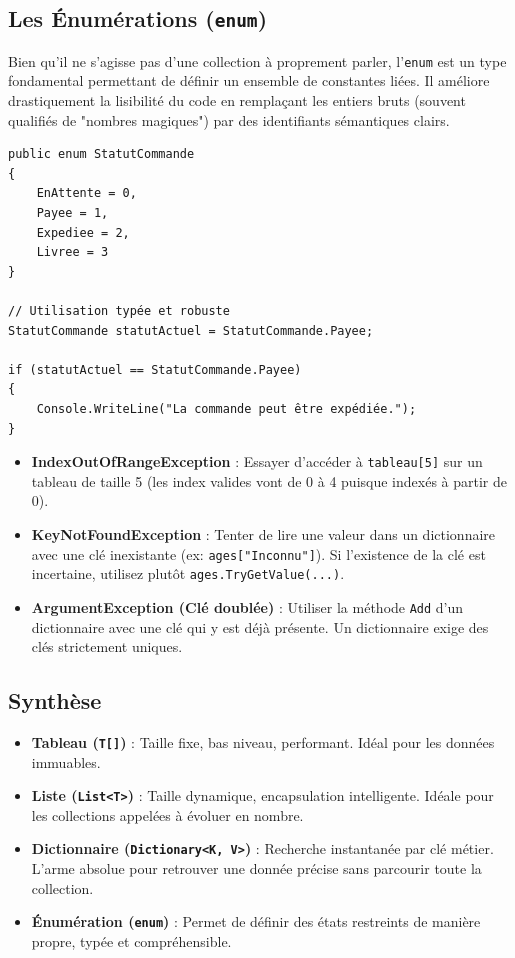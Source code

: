 \subsection{Les Énumérations (\texttt{enum})}
Bien qu'il ne s'agisse pas d'une collection à proprement parler, l'\texttt{enum} est un type fondamental permettant de définir un ensemble de constantes liées. Il améliore drastiquement la lisibilité du code en remplaçant les entiers bruts (souvent qualifiés de "nombres magiques") par des identifiants sémantiques clairs.

\begin{lstlisting}[style=csharpstyle]
public enum StatutCommande
{
    EnAttente = 0,
    Payee = 1,
    Expediee = 2,
    Livree = 3
}

// Utilisation typée et robuste
StatutCommande statutActuel = StatutCommande.Payee;

if (statutActuel == StatutCommande.Payee)
{
    Console.WriteLine("La commande peut être expédiée.");
}
\end{lstlisting}

\begin{tcolorbox}[colback=backcolour,colframe=keywordcolor,title=\textbf{Pièges Courants \& Erreurs}]
\begin{itemize}
    \item \textbf{IndexOutOfRangeException} : Essayer d'accéder à \texttt{tableau[5]} sur un tableau de taille 5 (les index valides vont de 0 à 4 puisque indexés à partir de 0).
    \item \textbf{KeyNotFoundException} : Tenter de lire une valeur dans un dictionnaire avec une clé inexistante (ex: \texttt{ages["Inconnu"]}). Si l'existence de la clé est incertaine, utilisez plutôt \texttt{ages.TryGetValue(...)}.
    \item \textbf{ArgumentException (Clé doublée)} : Utiliser la méthode \texttt{Add} d'un dictionnaire avec une clé qui y est déjà présente. Un dictionnaire exige des clés strictement uniques.
\end{itemize}
\end{tcolorbox}

\subsection{Synthèse}
\begin{itemize}
    \item \textbf{Tableau (\texttt{T[]})} : Taille fixe, bas niveau, performant. Idéal pour les données immuables.
    \item \textbf{Liste (\texttt{List<T>})} : Taille dynamique, encapsulation intelligente. Idéale pour les collections appelées à évoluer en nombre.
    \item \textbf{Dictionnaire (\texttt{Dictionary<K, V>})} : Recherche instantanée par clé métier. L'arme absolue pour retrouver une donnée précise sans parcourir toute la collection.
    \item \textbf{Énumération (\texttt{enum})} : Permet de définir des états restreints de manière propre, typée et compréhensible.
\end{itemize}
